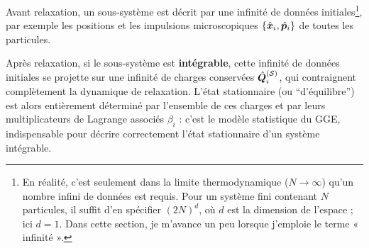 



Avant relaxation, un sous-système est décrit par une infinité de données initiales\footnote{En réalité, c’est seulement dans la limite thermodynamique ($N \to \infty$) qu’un nombre infini de données est requis. Pour un système fini contenant $N$ particules, il suffit d’en spécifier $(2N)^d$, où $d$ est la dimension de l’espace ; ici $d = 1$. Dans cette section, je m’avance un peu lorsque j’emploie le terme « infinité ».}, par exemple les positions et les impulsions microscopiques $\{ \hat{\bm{x}}_i , \hat{\bm{p}}_i \}$ de toutes les particules.


\smallskip

Après relaxation, si le sous-système est {\bf intégrable}, cette infinité de données initiales se projette sur une infinité de charges conservées $\hat{\bm{Q}}_i^{(\mathcal{S})}$, qui contraignent complètement la dynamique de relaxation. L’état stationnaire (ou “d’équilibre”) est alors entièrement déterminé par l’ensemble de ces charges et par leurs multiplicateurs de Lagrange associés $\beta_i$ : c’est le modèle statistique du \gls{GGE}, indispensable pour décrire correctement l’état stationnaire d’un système intégrable.

